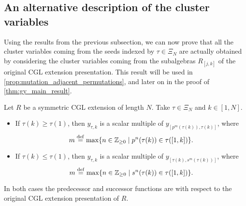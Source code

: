 \subsection{An alternative description of the cluster variables}

Using the results from the previous subsection, we can now prove that all the cluster variables coming from the seeds indexed by $\tau \in \Xi_N$ are actually obtained by considering the cluster variables coming from the subalgebras $R_{[j,k]}$ of the original CGL extension presentation. This result will be used in \cref{prop:mutation_adjacent_permutations}, and later on in the proof of \cref{thm:gy_main_result}.

\begin{lemma}\label{lem:y_tauk_y_brackets}
	Let $R$ be a symmetric CGL extension of length $N$. Take $\tau \in \Xi_N$ and $k \in [1, N]$.
	\begin{itemize}
		\item If $\tau(k) \geq \tau(1)$, then $y_{\tau,k}$ is a scalar multiple of $y_{[p^m(\tau(k)),
							      \tau(k)]}$, where
		      \begin{equation*}
			      m \overset{\mathrm{def}}{=} \max\{n \in \mathbb{Z}_{\geq 0} \mid p^n(\tau(k)) \in \tau([1,k])\}.
		      \end{equation*}
		\item If $\tau(k) \leq \tau(1)$, then $y_{\tau,k}$ is a scalar multiple of $y_{[\tau(k),s^m(
							      \tau(k))]}$, where
		      \begin{equation*}
			      m \overset{\mathrm{def}}{=} \max\{n \in \mathbb{Z}_{\geq 0} \mid s^n(\tau(k)) \in \tau([1,k])\}.
		      \end{equation*}
	\end{itemize}
	In both cases the predecessor and successor functions are with respect to the original
	CGL extension presentation of $R$.
\end{lemma}
